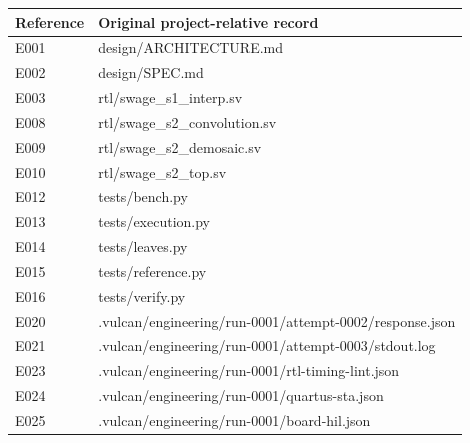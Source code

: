 \documentclass[11pt,a4paper]{article}
\begin{document}
{\small\renewcommand{\arraystretch}{1.18}\begin{longtable}{@{}L{0.12\textwidth}|L{0.82\textwidth}@{}}\toprule

\textbf{Reference} & \textbf{Original project-relative record}\\\midrule\endhead

E001 & design/\allowbreak{}ARCHITECTURE.md\\[2pt]\hline

E002 & design/\allowbreak{}SPEC.md\\[2pt]\hline

E003 & rtl/\allowbreak{}swage\_\allowbreak{}s1\_\allowbreak{}interp.sv\\[2pt]\hline

E008 & rtl/\allowbreak{}swage\_\allowbreak{}s2\_\allowbreak{}convolution.sv\\[2pt]\hline

E009 & rtl/\allowbreak{}swage\_\allowbreak{}s2\_\allowbreak{}demosaic.sv\\[2pt]\hline

E010 & rtl/\allowbreak{}swage\_\allowbreak{}s2\_\allowbreak{}top.sv\\[2pt]\hline

E012 & tests/\allowbreak{}bench.py\\[2pt]\hline

E013 & tests/\allowbreak{}execution.py\\[2pt]\hline

E014 & tests/\allowbreak{}leaves.py\\[2pt]\hline

E015 & tests/\allowbreak{}reference.py\\[2pt]\hline

E016 & tests/\allowbreak{}verify.py\\[2pt]\hline

E020 & .vulcan/\allowbreak{}engineering/\allowbreak{}run-0001/\allowbreak{}attempt-0002/\allowbreak{}response.json\\[2pt]\hline

E021 & .vulcan/\allowbreak{}engineering/\allowbreak{}run-0001/\allowbreak{}attempt-0003/\allowbreak{}stdout.log\\[2pt]\hline

E023 & .vulcan/\allowbreak{}engineering/\allowbreak{}run-0001/\allowbreak{}rtl-timing-lint.json\\[2pt]\hline

E024 & .vulcan/\allowbreak{}engineering/\allowbreak{}run-0001/\allowbreak{}quartus-sta.json\\[2pt]\hline

E025 & .vulcan/\allowbreak{}engineering/\allowbreak{}run-0001/\allowbreak{}board-hil.json\\[2pt]\hline

\bottomrule\end{longtable}}
\end{document}
